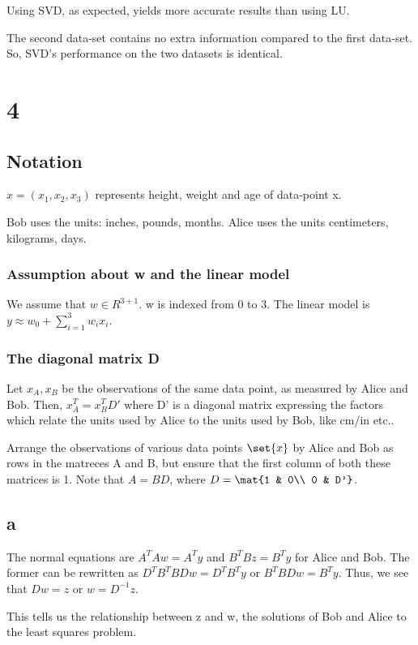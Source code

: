 \documentclass{article}
\begin{document}
Using SVD, as expected, yields more accurate results than using LU.

The second data-set contains no extra information compared to the first data-set. So, SVD's performance on the two datasets is identical.

\section{4}
\subsection{Notation}
$x = (x_{1}, x_{2}, x_{3})$ represents height, weight and age of data-point x.

Bob uses the units: inches, pounds, months. Alice uses the units centimeters, kilograms, days.

\subsubsection{Assumption about w and the linear model}
We assume that $w \in R^{3+1}$. w is indexed from 0 to 3. The linear model is $y \approx w_{0} + \sum_{i=1}^{3} w_{i}x_{i}$.

\subsubsection{The diagonal matrix D}
 Let $x_{A}, x_{B}$ be the observations of the same data point, as measured by Alice and Bob. Then, $x_{A}^{T} = x_{B}^{T}D' $ where D' is a diagonal matrix expressing the factors which relate the units used by Alice to the units used by Bob, like cm/in etc..

Arrange the observations of various data points $\set{x}$ by Alice and Bob as rows in the matreces A and B, but ensure that the first column of both these matrices is 1. Note that $A=BD$, where $D = \mat{1 & 0\\ 0 & D'}$.

\subsection{a}
The normal equations are $A^{T}Aw = A^{T}y$ and $B^{T}Bz = B^{T}y$ for Alice and Bob. The former can be rewritten as $D^{T}B^{T}BDw = D^{T}B^{T}y$ or $B^{T}BDw = B^{T}y$. Thus, we see that $Dw = z$ or $w = D^{-1}z$.

This tells us the relationship between z and w, the solutions of Bob and Alice to the least squares problem.
\end{document}
